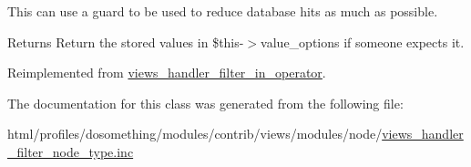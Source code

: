 This can use a guard to be used to reduce database hits as much as possible.

\begin{DoxyReturn}{Returns}
Return the stored values in \$this-\/$>$value\_\-options if someone expects it. 
\end{DoxyReturn}


Reimplemented from \hyperlink{classviews__handler__filter__in__operator_aa5b5df6d90f4359ed28c0c446bdc81a6}{views\_\-handler\_\-filter\_\-in\_\-operator}.

The documentation for this class was generated from the following file:\begin{DoxyCompactItemize}
\item 
html/profiles/dosomething/modules/contrib/views/modules/node/\hyperlink{views__handler__filter__node__type_8inc}{views\_\-handler\_\-filter\_\-node\_\-type.inc}\end{DoxyCompactItemize}
